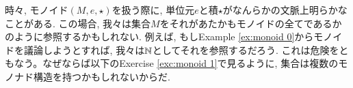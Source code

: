 \begin{remark}


時々, モノイド$(M,e,\star)$を扱う際に, 単位元$e$と積$\star$がなんらかの文脈上明らかなことがある. この場合, 我々は集合$M$をそれがあたかもモノイドの全てであるかのように参照するかもしれない. 例えば, もしExample \ref{ex:monoid 0}からモノイドを議論しようとすれば, 我々は${\mathbb N}$としてそれを参照するだろう. これは危険をともなう。なぜならば以下のExercise \ref{exc:monoid 1}で見るように, 集合は複数のモノナド構造を持つかもしれないからだ. 

\end{remark}

